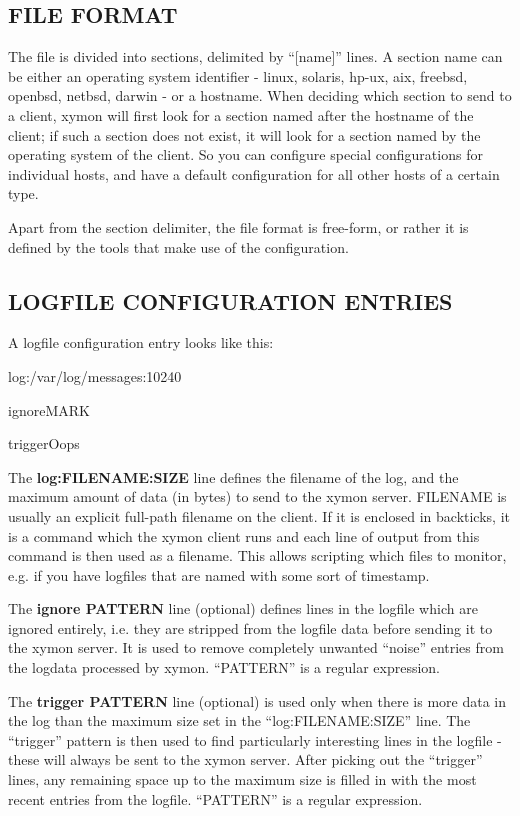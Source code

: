  
\subsection{FILE FORMAT}
 The file is divided into sections, delimited by ``[name]'' lines. A
 section name can be either an operating system identifier - linux,
 solaris, hp-ux, aix, freebsd, openbsd, netbsd, darwin - or a
 hostname. When deciding which section to send to a client, xymon
 will first look for a section named after the hostname of the client;
 if such a section does not exist, it will look for a section named by
 the operating system of the client. So you can configure special
 configurations for individual hosts, and have a default configuration
 for all other hosts of a certain type. 


  Apart from the section delimiter, the file format is free-form, or
  rather it is defined by the tools that make use of the
  configuration. 



 
\subsection{LOGFILE CONFIGURATION ENTRIES}
 A logfile configuration entry looks like this: 

  
log:/var/log/messages:10240  
 
ignoreMARK  
 
triggerOops 


  The \textbf{log:FILENAME:SIZE} line defines the filename of the log,
  and the maximum amount of data (in bytes) to send to the xymon
  server. FILENAME is usually an explicit full-path filename on the
  client. If it is enclosed in backticks, it is a command which the
  xymon client runs and each line of output from this command is then
  used as a filename. This allows scripting which files to monitor,
  e.g. if you have logfiles that are named with some sort of
  timestamp. 



  The \textbf{ignore PATTERN} line (optional) defines lines in the
  logfile which are ignored entirely, i.e. they are stripped from the
  logfile data before sending it to the xymon server. It is used to
  remove completely unwanted ``noise'' entries from the logdata
  processed by xymon. ``PATTERN'' is a regular expression. 



  The \textbf{trigger PATTERN}
 line (optional) is used only when there is more data in the log than
 the maximum size set in the ``log:FILENAME:SIZE'' line. The
 ``trigger'' pattern is then used to find particularly interesting
 lines in the logfile - these will always be sent to the xymon
 server. After picking out the ``trigger'' lines, any remaining space
 up to the maximum size is filled in with the most recent entries from
 the logfile. ``PATTERN'' is a regular expression. 



